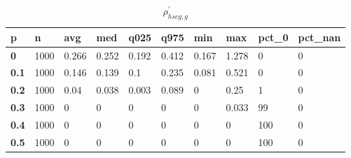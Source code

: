 \begin{table}[h]
 \centering 
\footnotesize
\caption{$\rho_{hscg,g}^\prime $}
\label{tab:alphahscgg}
\begin{tabular}[h]{|l|l|l|l|l|l|l|l|l|l|
    } \hline
\textbf{ p} & \textbf{ n} & \textbf{ avg} & \textbf{ med} & \textbf{ q025} & \textbf{ q975} & \textbf{ min} & \textbf{ max} & \textbf{ pct\_0} & \textbf{ pct\_nan}
    \\ \hline
  \textbf{  0} & 1000 & 0.266 & 0.252 & 0.192 & 0.412 & 0.167 & 1.278 &   0 & 0
    \\ \hline
  \textbf{0.1} & 1000 & 0.146 & 0.139 &   0.1 & 0.235 & 0.081 & 0.521 &   0 & 0
    \\ \hline
  \textbf{0.2} & 1000 &  0.04 & 0.038 & 0.003 & 0.089 &     0 &  0.25 &   1 & 0
    \\ \hline
  \textbf{0.3} & 1000 &     0 &     0 &     0 &     0 &     0 & 0.033 &  99 & 0
    \\ \hline
  \textbf{0.4} & 1000 &     0 &     0 &     0 &     0 &     0 &     0 & 100 & 0
    \\ \hline
  \textbf{0.5} & 1000 &     0 &     0 &     0 &     0 &     0 &     0 & 100 & 0
    \\ \hline
 \end{tabular}
 \end{table}
